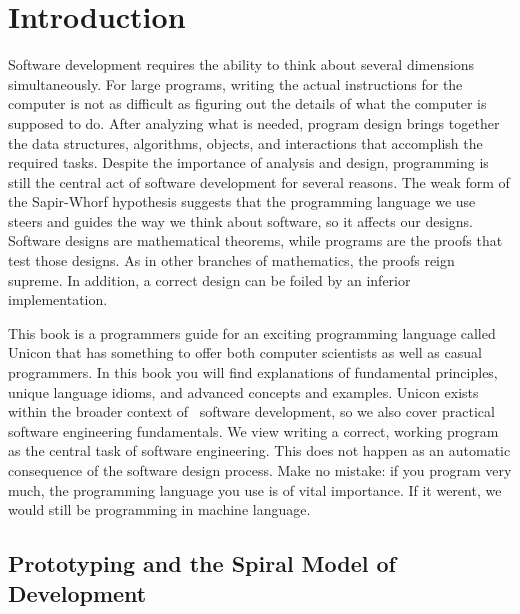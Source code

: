 \section{Introduction}

Software development requires the ability to think about several
dimensions simultaneously. For large programs, writing the actual
instructions for the computer is not as difficult as figuring out the
details of what the computer is supposed to do. After analyzing what is
needed, program design brings together the data structures, algorithms,
objects, and interactions that accomplish the required tasks. Despite
the importance of analysis and design, programming is still the central
act of software development for several reasons. The weak form of the
Sapir-Whorf hypothesis suggests that the programming
language we use steers and guides the way we think about software, so
it affects our designs. Software designs are mathematical theorems,
while programs are the proofs that test those designs. As in other
branches of mathematics, the proofs reign supreme. In addition, a
correct design can be foiled by an inferior implementation.

This book is a programmer{\textquotesingle}s guide for an exciting
programming language called Unicon that has something to offer both
computer scientists as well as casual programmers. In this book you
will find explanations of fundamental principles, unique language
idioms, and advanced concepts and examples. Unicon exists within the
broader context of \ software development, so we also cover practical
software engineering fundamentals. We view writing a correct, working
program as the central task of software engineering. This does not
happen as an automatic consequence of the software design process. Make
no mistake: if you program very much, the programming language you use
is of vital importance. If it weren{\textquotesingle}t, we would still
be programming in machine language.

\subsection{Prototyping and the Spiral Model of Development}

